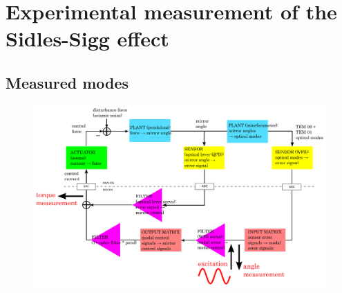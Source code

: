\chapter{Experimental measurement of the Sidles-Sigg effect}


\section{Measured modes}


\begin{figure}
\begin{centering}
\includegraphics[width=1.0\textwidth]{figures/ascservo_measurement.pdf}
\caption{}
\label{}
\end{centering}
\end{figure}

